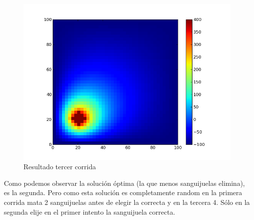 \begin{figure}[htb]
\begin{center}
\includegraphics[scale=0.50]{imagenes/random_3.png} 
\caption{Resultado tercer corrida} 
\end{center}
\end{figure}

Como podemos observar la solución óptima (la que menos sanguijuelas elimina), es la segunda. Pero como esta solución es completamente random en la primera corrida mata 2 sanguijuelas antes de elegir la correcta y en la tercera 4. Sólo en la segunda elije en el primer intento la sanguijuela correcta.

